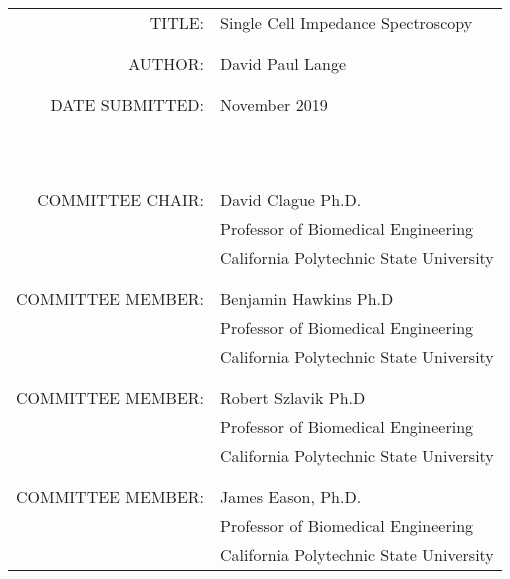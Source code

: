 \vspace{0.5 in}

\begin{tabular}{r l}
    TITLE:\;\;\;\;\; & Single Cell Impedance Spectroscopy\\
    \\
    \\
    AUTHOR:\;\;\;\;\; & David Paul Lange\\
    \\
    \\
    DATE SUBMITTED:\;\;\;\;\;\; & November 2019\\
    \\
    \\
    \\
    \\
    \\
    \\
    \\
    \\
    \\
    \\
    \\
    COMMITTEE CHAIR:\;\;\;\;\; & David Clague Ph.D.\\ 
    \;\;\;\;\; & Professor of Biomedical Engineering\\
    \;\;\;\;\; & California Polytechnic State University\\
    \\
    \\
    COMMITTEE MEMBER: \;\;\;\;\; & Benjamin Hawkins Ph.D\\
    \;\;\;\;\; & Professor of Biomedical Engineering\\
    \;\;\;\;\; & California Polytechnic State University\\
    \\
    \\
    COMMITTEE MEMBER: \;\;\;\;\; & Robert Szlavik Ph.D\\
    \;\;\;\;\; & Professor of Biomedical Engineering\\
    \;\;\;\;\; & California Polytechnic State University\\
    \\
    \\
    COMMITTEE MEMBER: \;\;\;\;\; & James Eason, Ph.D.\\
    \;\;\;\;\; & Professor of Biomedical Engineering \\
    \;\;\;\;\; & California Polytechnic State University\\
\end{tabular}


